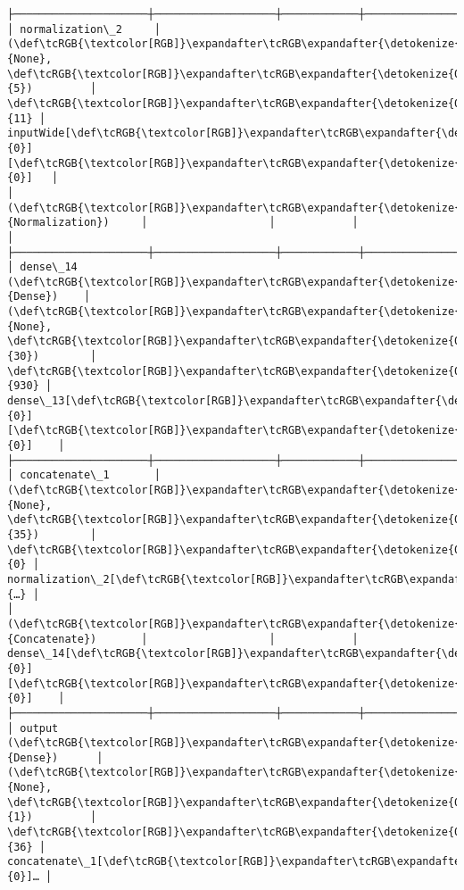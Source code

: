 \documentclass[12pt letter]{report}
\begin{document}
\begin{Verbatim}[commandchars=\\\{\}]
├─────────────────────┼───────────────────┼────────────┼───────────────────┤
│ normalization\_2     │ (\def\tcRGB{\textcolor[RGB]}\expandafter\tcRGB\expandafter{\detokenize{0,215,255}}{None}, \def\tcRGB{\textcolor[RGB]}\expandafter\tcRGB\expandafter{\detokenize{0,175,0}}{5})         │         \def\tcRGB{\textcolor[RGB]}\expandafter\tcRGB\expandafter{\detokenize{0,175,0}}{11} │ inputWide[\def\tcRGB{\textcolor[RGB]}\expandafter\tcRGB\expandafter{\detokenize{0,175,0}}{0}][\def\tcRGB{\textcolor[RGB]}\expandafter\tcRGB\expandafter{\detokenize{0,175,0}}{0}]   │
│ (\def\tcRGB{\textcolor[RGB]}\expandafter\tcRGB\expandafter{\detokenize{0,135,255}}{Normalization})     │                   │            │                   │
├─────────────────────┼───────────────────┼────────────┼───────────────────┤
│ dense\_14 (\def\tcRGB{\textcolor[RGB]}\expandafter\tcRGB\expandafter{\detokenize{0,135,255}}{Dense})    │ (\def\tcRGB{\textcolor[RGB]}\expandafter\tcRGB\expandafter{\detokenize{0,215,255}}{None}, \def\tcRGB{\textcolor[RGB]}\expandafter\tcRGB\expandafter{\detokenize{0,175,0}}{30})        │        \def\tcRGB{\textcolor[RGB]}\expandafter\tcRGB\expandafter{\detokenize{0,175,0}}{930} │ dense\_13[\def\tcRGB{\textcolor[RGB]}\expandafter\tcRGB\expandafter{\detokenize{0,175,0}}{0}][\def\tcRGB{\textcolor[RGB]}\expandafter\tcRGB\expandafter{\detokenize{0,175,0}}{0}]    │
├─────────────────────┼───────────────────┼────────────┼───────────────────┤
│ concatenate\_1       │ (\def\tcRGB{\textcolor[RGB]}\expandafter\tcRGB\expandafter{\detokenize{0,215,255}}{None}, \def\tcRGB{\textcolor[RGB]}\expandafter\tcRGB\expandafter{\detokenize{0,175,0}}{35})        │          \def\tcRGB{\textcolor[RGB]}\expandafter\tcRGB\expandafter{\detokenize{0,175,0}}{0} │ normalization\_2[\def\tcRGB{\textcolor[RGB]}\expandafter\tcRGB\expandafter{\detokenize{0,175,0}}{…} │
│ (\def\tcRGB{\textcolor[RGB]}\expandafter\tcRGB\expandafter{\detokenize{0,135,255}}{Concatenate})       │                   │            │ dense\_14[\def\tcRGB{\textcolor[RGB]}\expandafter\tcRGB\expandafter{\detokenize{0,175,0}}{0}][\def\tcRGB{\textcolor[RGB]}\expandafter\tcRGB\expandafter{\detokenize{0,175,0}}{0}]    │
├─────────────────────┼───────────────────┼────────────┼───────────────────┤
│ output (\def\tcRGB{\textcolor[RGB]}\expandafter\tcRGB\expandafter{\detokenize{0,135,255}}{Dense})      │ (\def\tcRGB{\textcolor[RGB]}\expandafter\tcRGB\expandafter{\detokenize{0,215,255}}{None}, \def\tcRGB{\textcolor[RGB]}\expandafter\tcRGB\expandafter{\detokenize{0,175,0}}{1})         │         \def\tcRGB{\textcolor[RGB]}\expandafter\tcRGB\expandafter{\detokenize{0,175,0}}{36} │ concatenate\_1[\def\tcRGB{\textcolor[RGB]}\expandafter\tcRGB\expandafter{\detokenize{0,175,0}}{0}]… │

\end{Verbatim}
\end{document}
